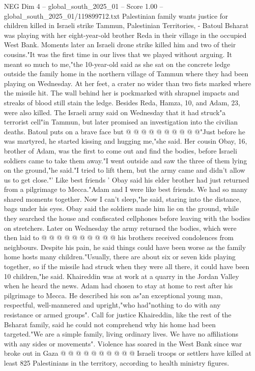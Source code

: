 \begin{textsample}{NEG Dim 4 – global\_south\_2025\_01 – Score 1.00 – global\_south\_2025\_01/119899712.txt}  \label{ex:f4_neg_449}
Palestinian family wants justice for children killed in Israeli strike Tammun, Palestinian Territories, - Batoul Bsharat was playing with her eight-year-old brother Reda in their village in the occupied West Bank.
Moments later an Israeli drone strike killed him and two of their cousins."It was the first time in our lives that we played without arguing.
It meant so much to me,"the 10-year-old said as she sat on the concrete ledge outside the family home in the northern village of Tammun where they had been playing on Wednesday.
At her feet, a crater no wider than two fists marked where the missile hit.
The wall behind her is pockmarked with shrapnel impacts and streaks of blood still stain the ledge.
Besides Reda, Hamza, 10, and Adam, 23, were also killed.
The Israeli army said on Wednesday that it had struck"a terrorist cell"in Tammun, but later promised an investigation into the civilian deaths.
Batoul puts on a brave face but @ @ @ @ @ @ @ @ @ @"Just before he was martyred, he started kissing and hugging me,"she said.
Her cousin Obay, 16, brother of Adam, was the first to come out and find the bodies, before Israeli soldiers came to take them away."I went outside and saw the three of them lying on the ground,"he said."I tried to lift them, but the army came and didn't allow us to get close."' Like best friends ' Obay said his elder brother had just returned from a pilgrimage to Mecca."Adam and I were like best friends.
We had so many shared moments together.
Now I can't sleep,"he said, staring into the distance, bags under his eyes.
Obay said the soldiers made him lie on the ground, while they searched the house and confiscated cellphones before leaving with the bodies on stretchers.
Later on Wednesday the army returned the bodies, which were then laid to @ @ @ @ @ @ @ @ @ @ his brothers received condolences from neighbours.
Despite his pain, he said things could have been worse as the family home hosts many children."Usually, there are about six or seven kids playing together, so if the missile had struck when they were all there, it could have been 10 children,"he said.
Khaireddin was at work at a quarry in the Jordan Valley when he heard the news.
Adam had chosen to stay at home to rest after his pilgrimage to Mecca.
He described his son as"an exceptional young man, respectful, well-mannered and upright,"who had"nothing to do with any resistance or armed groups".
Call for justice Khaireddin, like the rest of the Bsharat family, said he could not comprehend why his home had been targeted."We are a simple family, living ordinary lives.
We have no affiliations with any sides or movements".
Violence has soared in the West Bank since war broke out in Gaza @ @ @ @ @ @ @ @ @ @ Israeli troops or settlers have killed at least 825 Palestinians in the territory, according to health ministry figures.

\end{textsample}

